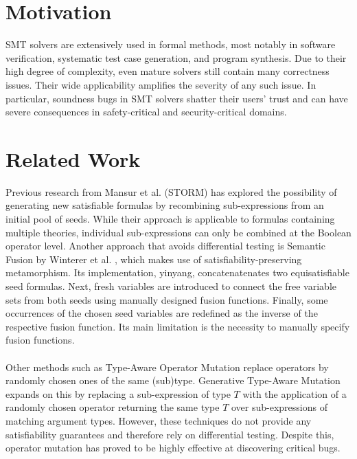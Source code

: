 \section*{Motivation}

SMT solvers are extensively used in formal methods, most notably in software verification, systematic test case generation, and program synthesis. Due to their high degree of complexity, even mature solvers still contain many correctness issues. Their wide applicability amplifies the severity of any such issue. In particular, soundness bugs in SMT solvers shatter their users' trust and can have severe consequences in safety-critical and security-critical domains.

\section*{Related Work}

Previous research from Mansur et al. (STORM) \cite{STORM} has explored the possibility of generating new satisfiable formulas by recombining sub-expressions from an initial pool of seeds. While their approach is applicable to formulas containing multiple theories, individual sub-expressions can only be combined at the Boolean operator level. Another approach that avoids differential testing is Semantic Fusion by Winterer et al. \cite{SemFusion}, which makes use of satisfiability-preserving metamorphism. Its implementation, yinyang, concatenatenates two equisatisfiable seed formulas. Next, fresh variables are introduced to connect the free variable sets from both seeds using manually designed fusion functions. Finally, some occurrences of the chosen seed variables are redefined as the inverse of the respective fusion function. Its main limitation is the necessity to manually specify fusion functions. \\
\\
Other methods such as Type-Aware Operator Mutation \cite{TAOM} replace operators by randomly chosen ones of the same (sub)type. Generative Type-Aware Mutation \cite{GTAM} expands on this by replacing a sub-expression of type $T$ with the application of a randomly chosen operator returning the same type $T$ over sub-expressions of matching argument types. However, these techniques do not provide any satisfiability guarantees and therefore rely on differential testing. Despite this, operator mutation has proved to be highly effective at discovering critical bugs.

